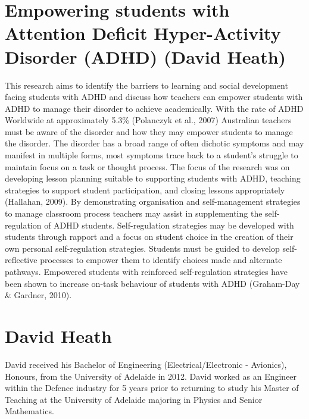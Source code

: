 \documentclass[twoside,14pt,a4paper,notitlepage]{memoir}
\begin{document}
\section*{Empowering students with Attention Deficit Hyper-Activity Disorder (ADHD) (David Heath)}
\label{aut:heath}

This research aims to identify the barriers to learning and social development facing students with ADHD and discuss how teachers can empower students with ADHD to manage their disorder to achieve academically.
With the rate of ADHD Worldwide at approximately 5.3\% (Polanczyk et al., 2007) Australian teachers must be aware of the disorder and how they may empower students to manage the disorder. The disorder has a broad range of often dichotic symptoms and may manifest in multiple forms, most symptoms trace back to a student’s struggle to maintain focus on a task or thought process.
The focus of the research was on developing lesson planning suitable to supporting students with ADHD, teaching strategies to support student participation, and closing lessons appropriately (Hallahan, 2009). By demonstrating organisation and self-management strategies to manage classroom process teachers may assist in supplementing the self-regulation of ADHD students. Self-regulation strategies may be developed with students through rapport and a focus on student choice in the creation of their own personal self-regulation strategies. Students must be guided to develop self-reflective processes to empower them to identify choices made and alternate pathways. Empowered students with reinforced self-regulation strategies have been shown to increase on-task behaviour of students with ADHD (Graham-Day \& Gardner, 2010).

\section*{David Heath}

David received his Bachelor of Engineering (Electrical/Electronic - Avionics), Honours, from the University of Adelaide in 2012. David worked as an Engineer within the Defence industry for 5 years prior to returning to study his Master of Teaching at the University of Adelaide majoring in Physics and Senior Mathematics.
\end{document}
